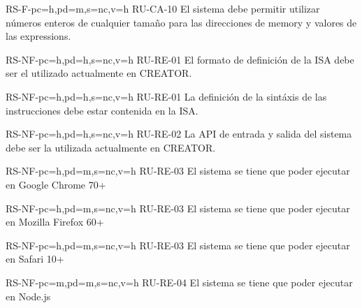 \begin{softwareReq}{RS-F-}{pc=h,pd=m,s=nc,v=h}
    {RU-CA-10}
    El sistema debe permitir utilizar números enteros de cualquier tamaño para
    las direcciones de \gls{memory} y valores de las \glspl{expression}.
\end{softwareReq}


\setcounter{i}{1}

\begin{softwareReq}{RS-NF-}{pc=h,pd=h,s=nc,v=h}
    {RU-RE-01}
    El formato de definición de la \gls{ISA} debe ser el utilizado
    actualmente en CREATOR.
\end{softwareReq}

\begin{softwareReq}{RS-NF-}{pc=h,pd=h,s=nc,v=h}
    {RU-RE-01}
    La definición de la sintáxis de las instrucciones debe estar contenida en la
    \gls{ISA}.
\end{softwareReq}

\begin{softwareReq}{RS-NF-}{pc=h,pd=h,s=nc,v=h}
    {RU-RE-02}
    La \gls{API} de entrada y salida del sistema debe ser la utilizada
    actualmente en CREATOR.
\end{softwareReq}

\begin{softwareReq}{RS-NF-}{pc=h,pd=m,s=nc,v=h}
    {RU-RE-03}
    El sistema se tiene que poder ejecutar en Google Chrome 70+
\end{softwareReq}

\begin{softwareReq}{RS-NF-}{pc=h,pd=m,s=nc,v=h}
    {RU-RE-03}
    El sistema se tiene que poder ejecutar en Mozilla Firefox 60+
\end{softwareReq}

\begin{softwareReq}{RS-NF-}{pc=h,pd=m,s=nc,v=h}
    {RU-RE-03}
    El sistema se tiene que poder ejecutar en Safari 10+
\end{softwareReq}

\begin{softwareReq}{RS-NF-}{pc=m,pd=m,s=nc,v=h}
    {RU-RE-04}
    El sistema se tiene que poder ejecutar en Node.js
\end{softwareReq}

